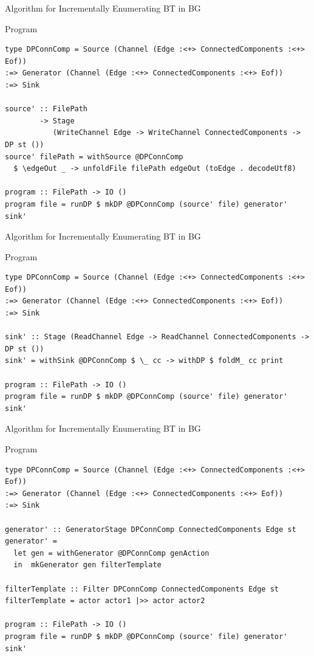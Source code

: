 \documentclass{beamer}
\begin{document}
  \begin{frame}[fragile]{Algorithm for Incrementally Enumerating BT in BG}
    \begin{block}{Program}
      \begin{verbatim}      
type DPConnComp = Source (Channel (Edge :<+> ConnectedComponents :<+> Eof))
:=> Generator (Channel (Edge :<+> ConnectedComponents :<+> Eof))
:=> Sink

source' :: FilePath
        -> Stage
           (WriteChannel Edge -> WriteChannel ConnectedComponents -> DP st ())
source' filePath = withSource @DPConnComp
  $ \edgeOut _ -> unfoldFile filePath edgeOut (toEdge . decodeUtf8)

program :: FilePath -> IO ()
program file = runDP $ mkDP @DPConnComp (source' file) generator' sink'  
      \end{verbatim}
    \end{block}
  \end{frame}

  \begin{frame}[fragile]{Algorithm for Incrementally Enumerating BT in BG}
    \begin{block}{Program}
      \begin{verbatim}      
type DPConnComp = Source (Channel (Edge :<+> ConnectedComponents :<+> Eof))
:=> Generator (Channel (Edge :<+> ConnectedComponents :<+> Eof))
:=> Sink

sink' :: Stage (ReadChannel Edge -> ReadChannel ConnectedComponents -> DP st ())
sink' = withSink @DPConnComp $ \_ cc -> withDP $ foldM_ cc print

program :: FilePath -> IO ()
program file = runDP $ mkDP @DPConnComp (source' file) generator' sink'  
      \end{verbatim}
    \end{block}
  \end{frame}

  \begin{frame}[fragile]{Algorithm for Incrementally Enumerating BT in BG}
    \begin{block}{Program}
      \begin{verbatim}      
type DPConnComp = Source (Channel (Edge :<+> ConnectedComponents :<+> Eof))
:=> Generator (Channel (Edge :<+> ConnectedComponents :<+> Eof))
:=> Sink

generator' :: GeneratorStage DPConnComp ConnectedComponents Edge st
generator' =
  let gen = withGenerator @DPConnComp genAction
  in  mkGenerator gen filterTemplate

filterTemplate :: Filter DPConnComp ConnectedComponents Edge st
filterTemplate = actor actor1 |>> actor actor2

program :: FilePath -> IO ()
program file = runDP $ mkDP @DPConnComp (source' file) generator' sink'
      \end{verbatim}
    \end{block}
  \end{frame}
\end{document}

